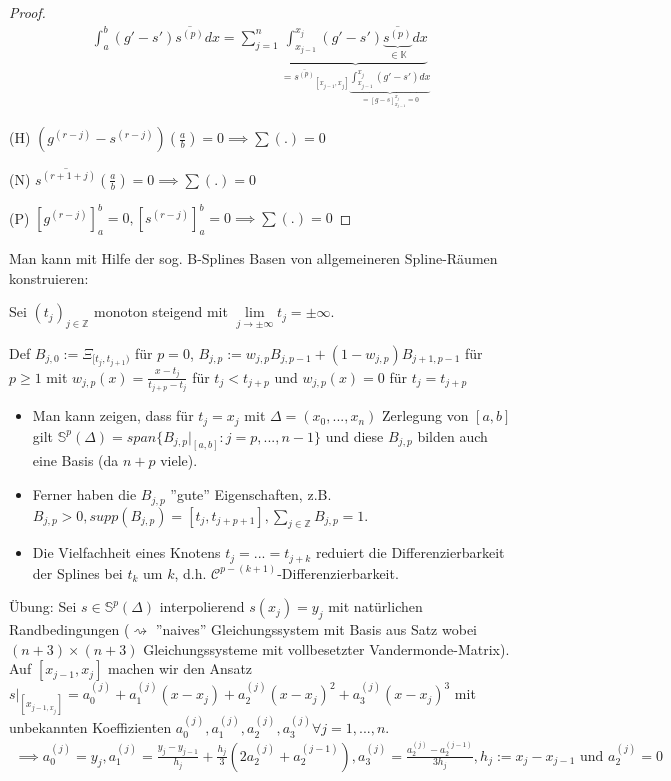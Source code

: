 \begin{proof}
	\begin{align*}
		\int_{a}^{b} (g' - s') \overline{s^{(p)}} dx = \sum_{j=1}^{n} \underbrace{\int_{x_{j-1}}^{x_j} (g' - s') \underbrace{\overline{s^{(p)}}}_{\in \mathbb{K}} dx}_{= \overline{s^{(p)}}_{[x_{j-1}, x_j]} \underbrace{\int_{x_{j-1}}^{x_j} (g' - s') dx}_{=[g-s]_{x_{j-1}}^{x_j} = 0} }
	\end{align*}
	
	(H) $(g^{(r-j)} - s^{(r-j)})(\frac{a}{b}) = 0 \implies \sum(.) = 0$
	
	(N) $\overline{s^{(r+1+j)}}(\frac{a}{b})=0 \implies \sum (.) = 0$
	
	(P) $[g^{(r-j)}]_a^b = 0, [s^{(r-j)}]_a^b = 0 \implies \sum(.) = 0$
\end{proof}

\begin{remark}
	Man kann mit Hilfe der sog. B-Splines Basen von allgemeineren Spline-Räumen konstruieren:
	
	Sei $(t_j)_{j \in \mathbb{Z}}$ monoton steigend mit $\lim\limits_{j \rightarrow \pm \infty} t_j = \pm \infty$.
	
	Def $B_{j, 0} := \Xi_{[t_j, t_{j+1})}$ für $p = 0$, $B_{j,p} := w_{j,p} B_{j,p-1} + (1-w_{j,p})B_{j+1,p-1}$ für $p \geq 1$ mit $w_{j,p}(x) = \frac{x-t_j}{t_{j+p} - t_j}$ für $t_j < t_{j+p}$ und $w_{j,p}(x) = 0$ für $t_j = t_{j+p}$
	
	\begin{itemize}
		\item Man kann zeigen, dass für $t_j = x_j$ mit $\Delta=(x_0, ..., x_n)$ Zerlegung von $[a,b]$ gilt $\mathbb{S}^p(\Delta) = span\{B_{j,p}|_{[a,b]}: j=p, ..., n-1\}$ und diese $B_{j,p}$ bilden auch eine Basis (da $n+p$ viele).
		
		\item Ferner haben die $B_{j,p}$ ''gute'' Eigenschaften, z.B. $B_{j,p} > 0, supp(B_{j,p}) = [t_j, t_{j+p+1}], \sum_{j \in \mathbb{Z}} B_{j,p} = 1$.
		
		\item Die Vielfachheit eines Knotens $t_j = ... = t_{j+k}$ reduiert die Differenzierbarkeit der Splines bei $t_k$ um $k$, d.h. $\mathcal{C}^{p-(k+1)}$-Differenzierbarkeit.
	\end{itemize}
\end{remark}

Übung: Sei $s \in \mathbb{S}^p(\Delta)$ interpolierend $s(x_j) = y_j$ mit natürlichen Randbedingungen ($\rightsquigarrow$ ''naives'' Gleichungssystem mit Basis aus Satz wobei $(n+3)\times(n+3)$ Gleichungssysteme mit vollbesetzter Vandermonde-Matrix). Auf $[x_{j-1}, x_j]$ machen wir den Ansatz $s|_{[x_{j-1, x_j}]} = a_0^{(j)} + a_1^{(j)} (x-x_j) + a_2^{(j)} (x-x_j)^2 + a_3^{(j)}(x-x_j)^3$ mit unbekannten Koeffizienten $a_0^{(j)}, a_1^{(j)}, a_2^{(j)}, a_3^{(j)} \forall j=1, ..., n$.
\begin{align*}
	\implies a_0^{(j)} = y_j, a_1^{(j)} = \frac{y_j - y_{j-1}}{h_j} + \frac{h_j}{3} (2 a_2^{(j)} + a_2^{(j-1)}), a_3^{(j)} = \frac{a_2^{(j)} - a_2^{(j-1)}}{3h_j}, h_j := x_j - x_{j-1} \text{ und } a_2^{(j)} = 0 
\end{align*}

